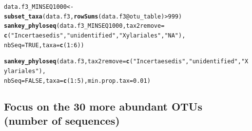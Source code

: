 \documentclass[12pt]{article}\usepackage[]{graphicx}\usepackage[]{color}
\makeatletter
\newcommand{\hlnum}[1]{\textcolor[rgb]{0.686,0.059,0.569}{#1}}%
\newcommand{\hlstr}[1]{\textcolor[rgb]{0.192,0.494,0.8}{#1}}%
\newcommand{\hlopt}[1]{\textcolor[rgb]{0,0,0}{#1}}%
\newcommand{\hlstd}[1]{\textcolor[rgb]{0.345,0.345,0.345}{#1}}%
\newcommand{\hlkwb}[1]{\textcolor[rgb]{0.69,0.353,0.396}{#1}}%
\newcommand{\hlkwc}[1]{\textcolor[rgb]{0.333,0.667,0.333}{#1}}%
\newcommand{\hlkwd}[1]{\textcolor[rgb]{0.737,0.353,0.396}{\textbf{#1}}}%
\newenvironment{kframe}{%
 \def\at@end@of@kframe{}%
 \ifinner\ifhmode%
  \def\at@end@of@kframe{\end{minipage}}%
  \begin{minipage}{\columnwidth}%
 \fi\fi%
 \def\FrameCommand##1{\hskip\@totalleftmargin \hskip-\fboxsep
 \colorbox{shadecolor}{##1}\hskip-\fboxsep
     \hskip-\linewidth \hskip-\@totalleftmargin \hskip\columnwidth}%
 \MakeFramed {\advance\hsize-\width
   \@totalleftmargin\z@ \linewidth\hsize
   \@setminipage}}%
 {\par\unskip\endMakeFramed%
 \at@end@of@kframe}
\newenvironment{knitrout}{}{} %
\numberwithin{figure}{section}
\makeatother
\begin{document}
\begin{knitrout}\small
{}\color{fgcolor}\begin{kframe}
\begin{alltt}
\hlstd{data.f3_MINSEQ1000} \hlkwb{<-} \hlkwd{subset_taxa}\hlstd{(data.f3,} \hlkwd{rowSums}\hlstd{(data.f3}\hlopt{@}\hlkwc{otu_table}\hlstd{)}\hlopt{>}\hlnum{999}\hlstd{)}
\hlkwd{sankey_phyloseq}\hlstd{(data.f3_MINSEQ1000,} \hlkwc{tax2remove} \hlstd{=}
                  \hlkwd{c}\hlstd{(}\hlstr{"Incertae sedis"}\hlstd{,} \hlstr{"unidentified"}\hlstd{,} \hlstr{"Xylariales"}\hlstd{,} \hlstr{"NA"}\hlstd{),}
                \hlkwc{nbSeq} \hlstd{=} \hlnum{TRUE}\hlstd{,} \hlkwc{taxa} \hlstd{=} \hlkwd{c}\hlstd{(}\hlnum{1}\hlopt{:}\hlnum{6}\hlstd{))}
\end{alltt}
\end{kframe}
\end{knitrout}

\begin{knitrout}\small
{}\color{fgcolor}\begin{kframe}
\begin{alltt}
\hlkwd{sankey_phyloseq}\hlstd{(data.f3,} \hlkwc{tax2remove} \hlstd{=} \hlkwd{c}\hlstd{(}\hlstr{"Incertae sedis"}\hlstd{,} \hlstr{"unidentified"}\hlstd{,} \hlstr{"Xylariales"}\hlstd{),}
                \hlkwc{nbSeq} \hlstd{=} \hlnum{FALSE}\hlstd{,} \hlkwc{taxa} \hlstd{=} \hlkwd{c}\hlstd{(}\hlnum{1}\hlopt{:}\hlnum{5}\hlstd{),} \hlkwc{min.prop.tax} \hlstd{=} \hlnum{0.01}\hlstd{)}
\end{alltt}
\end{kframe}
\end{knitrout}

  \subsection{Focus on the 30 more abundant OTUs (number of sequences)}
\end{document}
